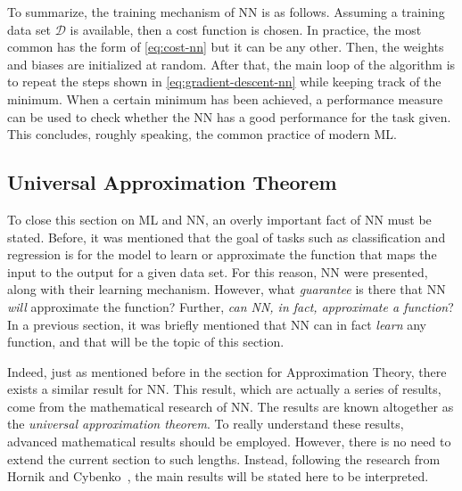 To summarize, the training mechanism of NN is as follows. Assuming a training data set 
\(\mathcal{D}\) is available, then a cost function is chosen. In practice, the most common 
has the form of \autoref{eq:cost-nn} but it can be any other. Then, the weights and biases 
are initialized at random. After that, the main loop of the algorithm is to repeat the 
steps shown in \autoref{eq:gradient-descent-nn} while keeping track of the minimum. When a 
certain minimum has been achieved, a performance measure can be used to check whether the NN 
has a good performance for the task given. This concludes, roughly speaking, the common 
practice of modern ML.

\subsection{Universal Approximation Theorem} \label{sec:approximation-thm}
To close this section on ML and NN, an overly important fact of NN must be stated. Before, 
it was mentioned that the goal of tasks such as classification and regression is for the 
model to learn or approximate the function that maps the input to the output for a given 
data set. For this reason, NN were presented, along with their learning mechanism. However, 
what \emph{guarantee} is there that NN \emph{will} approximate the function? Further, 
\emph{can NN, in fact, approximate a function}? In a previous section, it was briefly 
mentioned that NN can in fact \emph{learn} any function, and that will be the topic of this 
section.

Indeed, just as mentioned before in the section for Approximation Theory, there exists a 
similar result for NN. This result, which are actually a series of results, come from the 
mathematical research of NN. The results are known altogether as the \emph{universal 
approximation theorem}. To really understand these results, advanced mathematical results 
should be employed. However, there is no need to extend the current section to such 
lengths. Instead, following the research from Hornik and Cybenko~\cite{hornikMultilayerFeedforwardNetworks1989, hornikApproximationCapabilitiesMultilayer1991, cybenkoApproximationSuperpositionsSigmoidal1989}, 
the main results will be stated here to be interpreted.

